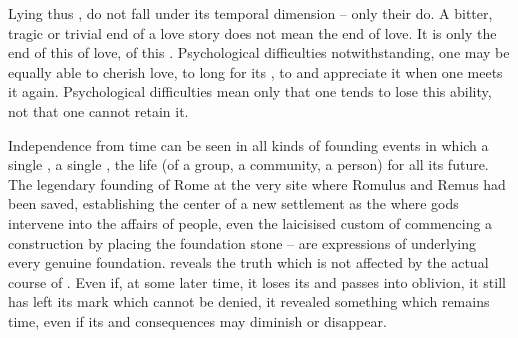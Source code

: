 
\pa 
Lying thus ,  do not fall under its temporal
dimension -- only their  do.  A bitter, tragic or trivial end
of a love story does not mean the end of love.  It is only the end of this
 of love, of this .  Psychological difficulties
notwithstanding, one may be equally able to cherish love, to long
for its , to  and appreciate it when one meets
it again. Psychological difficulties mean only that one tends to lose this
ability, not that one cannot retain it. 

Independence from time can be seen in all kinds of founding events in which
a single , a single , 
 the life (of a group, a community, a person) for all its future.
The legendary founding of Rome at the very site where Romulus and Remus had been
saved, establishing  the center of a new settlement as the  where gods intervene into the affairs of people, even the laicisised
custom of commencing a construction by placing the foundation stone -- are
 expressions of  underlying every genuine foundation. 
 reveals the truth which is not affected by the actual
course of .  Even if, at some later time, it loses its
 and passes into oblivion, it still has left its mark which cannot
be denied, it revealed something which remains  time, even if its
 and  consequences may diminish or
disappear.

